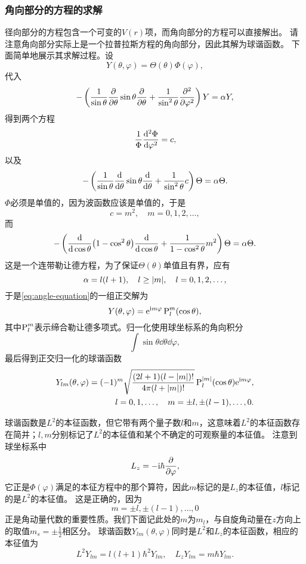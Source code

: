 \subsubsection{角向部分的方程的求解}

径向部分的方程包含一个可变的$V(r)$项，而角向部分的方程可以直接解出。
请注意角向部分实际上是一个拉普拉斯方程的角向部分，因此其解为球谐函数。
下面简单地展示其求解过程。设
\[
    Y(\theta, \varphi) = \Theta(\theta) \Phi(\varphi),
\]
代入
\[
    - \left( \frac{1}{\sin \theta} \pdv{\theta} \sin \theta \pdv{\theta} + \frac{1}{\sin^2 \theta} \pdv[2]{\varphi} \right) Y = \alpha Y,
\]
得到两个方程
\[
    \frac{1}{\Phi} \dv[2]{\Phi}{\varphi} = c,
\]
以及
\[
    - \left( \frac{1}{\sin \theta} \dv{\theta} \sin \theta \dv{\theta} + \frac{1}{\sin^2 \theta} c \right) \Theta = \alpha \Theta.
\]
$\Phi$必须是单值的，因为波函数应该是单值的，于是
\[
    c = m^2, \quad m = 0, 1, 2, \ldots,
\]
而
\[
    - \left( \dv{\cos \theta} (1 - \cos^2 \theta) \dv{\cos \theta} + \frac{1}{1 - \cos^2 \theta} m^2 \right) \Theta = \alpha \Theta.
\]
这是一个连带勒让德方程，为了保证$\Theta(\theta)$单值且有界，应有
\[
    \alpha = l(l+1), \quad l \geq \abs{m}, \quad l = 0, 1, 2, \ldots,
\]
于是\eqref{eq:angle-equation}的一组正交解为
\[
    Y(\theta, \varphi) = \mathrm{e}^{\mathrm{i} m \varphi} \operatorname{P}_l^m(\cos \theta),
\]
其中$\operatorname{P}_l^m$表示缔合勒让德多项式。归一化使用球坐标系的角向积分
\[
    \int \sin \theta \dd{\theta} \dd{\varphi},
\]
最后得到正交归一化的球谐函数
\begin{equation}
    \begin{split}
        Y_{lm}(\theta, \varphi) = (-1)^m \sqrt{\frac{(2l+1)(l-\abs{m})!}{4\pi (l+\abs{m})!}} \operatorname{P}_l^\abs{m} (\cos \theta) \mathrm{e}^{\mathrm{i} m \varphi}, \\
        l = 0, 1, \ldots, \quad m = \pm l, \pm (l-1), \ldots, 0 .
    \end{split}
\end{equation}

球谐函数是${L}^2$的本征函数，但它带有两个量子数$l$和$m$，这意味着${L}^2$的本征函数存在简并；$l,m$分别标记了${L}^2$的本征值和某个不确定的可观察量的本征值。
注意到球坐标系中
\[
    {L}_z = - \mathrm{i} \hbar \pdv{\varphi},
\]
它正是$\Phi(\varphi)$满足的本征方程中的那个算符，因此$m$标记的是${L}_z$的本征值，$l$标记的是${L}^2$的本征值。
这是正确的，因为
\[
    m = \pm l, \pm (l-1), \ldots, 0
\]
正是角动量代数的重要性质。我们下面记此处的$m$为$m_l$，与自旋角动量在$z$方向上的取值$m_s = \pm \frac{1}{2}$相区分。
球谐函数$Y_{lm}(\theta, \varphi)$同时是${L}^2$和$L_z$的本征函数，相应的本征值为
\begin{equation}
    {L}^2 Y_{lm} = l(l+1) \hbar^2 Y_{lm}, \quad {L}_z Y_{lm} = m \hbar Y_{lm}.
    \label{eq:orbital-angular-momentum}
\end{equation}

